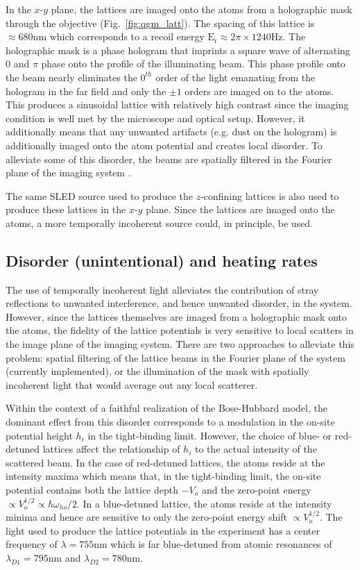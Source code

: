 In the $x$-$y$ plane, the lattices are imaged onto the atoms from a holographic mask through the objective (Fig.~\ref{fig:qgm_latt}). The spacing of this lattice is $\approx 680\mathrm{nm}$ which corresponds to a recoil energy $\mathrm{E_r} \approx 2 \pi \times 1240\mathrm{Hz}$. The holographic mask is a phase hologram that imprints a square wave of alternating $0$ and $\pi$ phase onto the profile of the illuminating beam\cite{Gillen2009,Peng2010}. This phase profile onto the beam nearly eliminates the $0^{th}$ order of the light emanating from the hologram in the far field and only the $\pm1$ orders are imaged on to the atoms. This produces a sinusoidal lattice with relatively high contrast since the imaging condition is well met by the microscope and optical setup. However, it additionally means that any unwanted artifacts (e.g. dust on the hologram) is additionally imaged onto the atom potential and creates local disorder. To alleviate some of this disorder, the beams are spatially filtered in the Fourier plane of the imaging system \cite{Peng2010}.

The same SLED source used to produce the $z$-confining lattices is also used to produce these lattices in the $x$-$y$ plane. Since the lattices are imaged onto the atoms, a more temporally incoherent source could, in principle, be used.

\subsection{Disorder (unintentional) and heating rates} \label{sec:ch2_heating}

The use of temporally incoherent light alleviates the contribution of stray reflections to unwanted interference, and hence unwanted disorder, in the system. However, since the lattices themselves are imaged from a holographic mask onto the atoms, the fidelity of the lattice potentials is very sensitive to local scatters in the image plane of the imaging system. There are two approaches to alleviate this problem: spatial filtering of the lattice beams in the Fourier plane of the system (currently implemented), or the illumination of the mask with spatially incoherent light that would average out any local scatterer.

Within the context of a faithful realization of the Bose-Hubbard model, the dominant effect from this disorder corresponds to a modulation in the on-site potential height $h_i$ in the tight-binding limit. However, the choice of blue- or red-detuned lattices affect the relationship of $h_i$ to the actual intensity of the scattered beam. In the case of red-detuned lattices, the atoms reside at the intensity maxima which means that, in the tight-binding limit, the on-site potential contains both the lattice depth $-V_o$ and the zero-point energy $\propto V_o^{1/2} \propto \hbar \omega_{ho}/2$. In a blue-detuned lattice, the atoms reside at the intensity minima and hence are sensitive to only the zero-point energy shift $\propto V_o^{1/2}$. The light used to produce the lattice potentials in the experiment has a center frequency of $\lambda=755\mathrm{nm}$ which is far blue-detuned from atomic resonances of $\lambda_{D1} = 795\mathrm{nm}$ and $\lambda_{D2}=780\mathrm{nm}$. 

